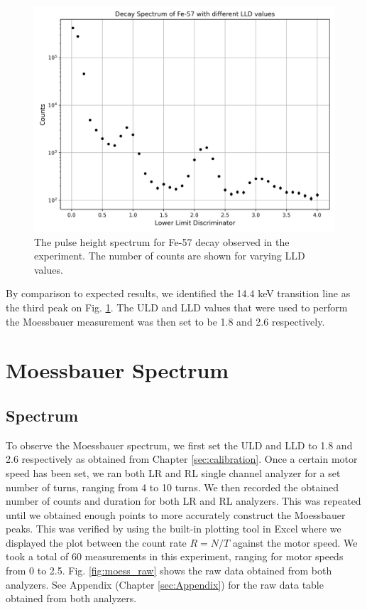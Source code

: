 \documentclass[a4paper]{report}
\numberwithin{equation}{section}
\begin{document}
\begin{figure}[htb!]
	\centering
	\includegraphics[width=0.7\columnwidth]{calib_plot.png}
	\caption{The pulse height spectrum for Fe-57 decay observed in the experiment. The number of counts are shown for varying 
	LLD values.}
	\label{fig:calibration_plot}
\end{figure}

By comparison to expected results, we identified the 14.4 keV transition line as the third peak on Fig. \ref{fig:calibration_plot}. 
The ULD and LLD values that were used to perform the Moessbauer measurement was then set to be 1.8 and 2.6 respectively. \par 



\chapter{Moessbauer Spectrum}

\section{Spectrum}

To observe the Moessbauer spectrum, we first set the ULD and LLD to 1.8 and 2.6 respectively as obtained from Chapter \ref{sec:calibration}. 
Once a certain motor speed has been set, we ran both LR and RL single channel analyzer for a set number of turns, ranging from 4 to 10
turns. We then recorded the obtained number of counts and duration for both LR and RL analyzers. This was repeated until we obtained 
enough points to more accurately construct the Moessbauer peaks. This was verified by using the built-in plotting tool in Excel where we 
displayed the plot between the count rate $R = N / T$ against the motor speed. We took a total of 60 measurements in this experiment, ranging for 
motor speeds from 0 to 2.5. Fig. \ref{fig:moess_raw} shows the raw data obtained from both analyzers. See Appendix (Chapter \ref{sec:Appendix}) for the raw data table obtained from both analyzers. \par 
\end{document}
